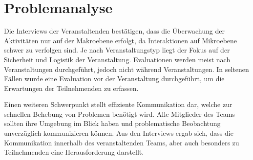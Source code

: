 

\section{Problemanalyse} \label{sec:analysis-problems}

Die Interviews der Veranstaltenden bestätigen, dass die Überwachung der
Aktivitäten nur auf der Makroebene erfolgt, da Interaktionen auf Mikroebene
schwer zu verfolgen sind. Je nach Veranstaltungstyp liegt der Fokus auf der
Sicherheit und Logistik der Veranstaltung. Evaluationen werden meist nach
Veranstaltungen durchgeführt, jedoch nicht während Veranstaltungen. In seltenen
Fällen wurde eine Evaluation vor der Veranstaltung durchgeführt, um die
Erwartungen der Teilnehmenden zu erfassen.

Einen weiteren Schwerpunkt stellt effiziente Kommunikation dar, welche zur
schnellen Behebung von Problemen benötigt wird. Alle Mitglieder des Teams
sollten ihre Umgebung im Blick haben und problematische Beobachtung unverzüglich
kommunizieren können. Aus den Interviews ergab sich, dass die Kommunikation
innerhalb des veranstaltenden Teams, aber auch besonders zu Teilnehmenden eine
Herausforderung darstellt.








